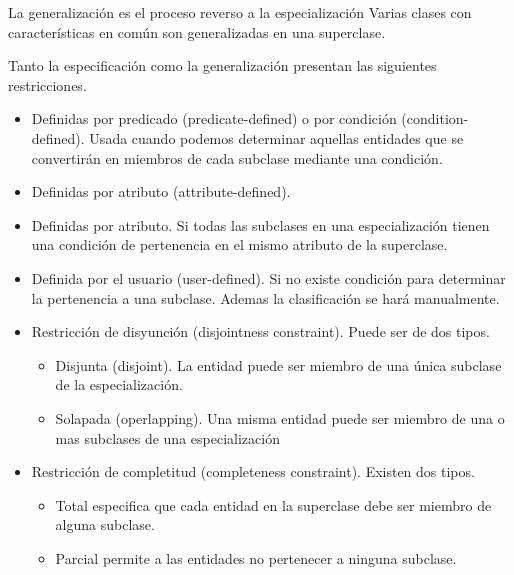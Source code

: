 \documentclass[12pt, titlepage]{article}
\begin{document}
    La generalización es el proceso reverso a la especialización Varias clases con características en común son generalizadas en una superclase.\cite{LIBRO1}
    
    Tanto la especificación como la generalización presentan las siguientes restricciones.
    \begin{itemize}
        \item Definidas por predicado (predicate-defined) o por condición (condition-defined). Usada cuando podemos determinar aquellas entidades que se convertirán en miembros de cada subclase mediante una condición.
        \item Definidas por atributo (attribute-defined). 
        \item Definidas por atributo. Si todas las subclases en una especialización tienen una condición de pertenencia en el mismo atributo de la superclase.
        \item Definida por el usuario (user-defined). Si no existe condición para determinar la pertenencia a una subclase. Ademas la clasificación se hará manualmente.
        \item Restricción de disyunción (disjointness constraint). Puede ser de dos tipos.
            \begin{itemize}
                \item Disjunta (disjoint). La entidad puede ser miembro de una única subclase de la especialización.
                \item Solapada (operlapping). Una misma entidad puede ser miembro de una o mas subclases de una especialización 
            \end{itemize}
        \item Restricción de completitud (completeness constraint). Existen dos tipos.
        \begin{itemize}
            \item Total especifica que cada entidad en la superclase debe ser miembro de alguna subclase.
            \item Parcial permite a las entidades no pertenecer a ninguna subclase.
        \end{itemize}
    \end{itemize}
\end{document}
